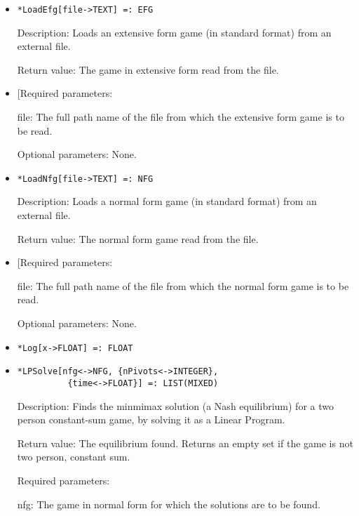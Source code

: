 \begin{itemize}
\item
\protect \large \begin{verbatim}
*LoadEfg[file->TEXT] =: EFG
\end{verbatim}\normalsize

\bd
\item
[Description:] Loads an extensive form game (in standard format) from
an external file.  
\item
[Return value:] The game in extensive form read from the file.
\item

[Required parameters:

\bd
\item
[file:] The full path name of the file from which the extensive form game
is to be read. \ed

\item
[Optional parameters:] None.\hfil\null
\ed

\item
\protect \large \begin{verbatim}
*LoadNfg[file->TEXT] =: NFG
\end{verbatim}\normalsize

\bd
\item
[Description:] Loads a normal form game (in standard format) from
an external file.  
\item
[Return value:] The normal form game read from the file.
\item

[Required parameters:

\bd
\item
[file:] The full path name of the file from which the normal form game
is to be read. \ed

\item
[Optional parameters:] None.\hfil\null
\ed

\item
\protect \large \begin{verbatim}
*Log[x->FLOAT] =: FLOAT
\end{verbatim} \normalsize

\item
\protect \large \begin{verbatim}
*LPSolve[nfg<->NFG, {nPivots<->INTEGER},
          {time<->FLOAT}] =: LIST(MIXED)
\end{verbatim}\normalsize

\bd
\item
[Description:] Finds the minmimax solution (a Nash equilibrium) for a
two person constant-sum game, by solving it as a Linear Program.
\item
[Return value:] The equilibrium found.  Returns an empty set if the
game is not two person, constant sum. 
\item
[Required parameters:]
\bd
\item
[nfg:] The game in normal form for which the solutions are to be found.  
\ed


\end{itemize}
